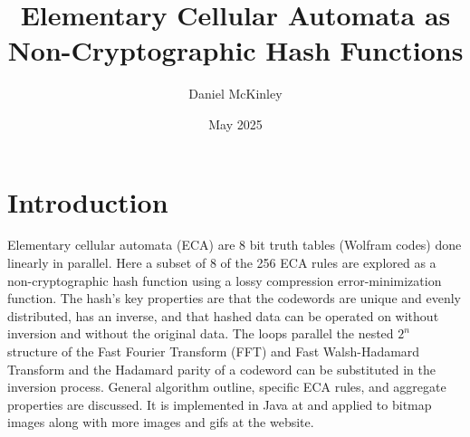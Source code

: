 \documentclass[11pt]{article}
\title{Elementary Cellular Automata as Non-Cryptographic Hash Functions}
\date{May 2025}
\author{Daniel McKinley}
\begin{document}
\maketitle

\section{Introduction}

Elementary cellular automata (ECA) are 8 bit truth tables (Wolfram codes) done linearly in parallel. \cite{Wolfram}
Here a subset of 8 of the 256 ECA rules are explored as a non-cryptographic hash function using a lossy compression error-minimization function. The hash's key properties are that the codewords are unique and evenly distributed, has an inverse, and that hashed data can be operated on without inversion and without the original data.  The loops parallel the nested $2^n$ structure of the Fast Fourier Transform (FFT) and Fast Walsh-Hadamard Transform and the Hadamard parity of a codeword can be substituted in the inversion process. General algorithm outline, specific ECA rules, and aggregate properties are discussed. It is implemented in Java at \cite{mygit} and applied to bitmap images along with more images and gifs at the website.\\
\end{document}
